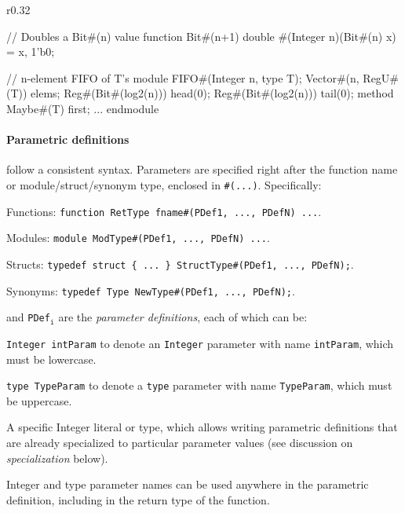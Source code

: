\begin{wrapfigure}{r}{0.32\columnwidth}
\vspace{-2em}
\begin{mscode}
// Doubles a Bit#(n) value
function Bit#(n+1) double
  #(Integer n)(Bit#(n) x)
  = {x, 1'b0};

// n-element FIFO of T's
module FIFO#(Integer n,
             type T);
 Vector#(n, RegU#(T)) elems;
 Reg#(Bit#(log2(n))) head(0);
 Reg#(Bit#(log2(n))) tail(0);
 method Maybe#(T) first;
 ...
endmodule
\end{mscode}
\vspace{-3em}
\end{wrapfigure}




\paragraph{Parametric definitions} follow a consistent syntax.
Parameters are specified right after the function name or module/struct/synonym type,
enclosed in \verb|#(...)|. Specifically:
\begin{compactitem}
\item Functions: \verb|function RetType fname#(PDef1, ..., PDefN) ...|.
\item Modules: \verb|module ModType#(PDef1, ..., PDefN) ...|.
\item Structs: \verb|typedef struct { ... } StructType#(PDef1, ..., PDefN);|.
\item Synonyms: \verb|typedef Type NewType#(PDef1, ..., PDefN);|.
\end{compactitem}
and \verb|PDef|$_{\texttt{i}}$ are the \emph{parameter definitions}, each of which can be:
\begin{compactitem}
\item \texttt{Integer intParam} to denote an \texttt{Integer} parameter with name \texttt{intParam}, which must be lowercase.
\item \texttt{type TypeParam} to denote a \texttt{type} parameter with name \texttt{TypeParam}, which must be uppercase.
\item A specific Integer literal or type, which allows writing parametric definitions that are already specialized to particular parameter values
  (see discussion on \emph{specialization} below).
\end{compactitem}
Integer and type parameter names can be used anywhere in the parametric definition,
including in the return type of the function.

